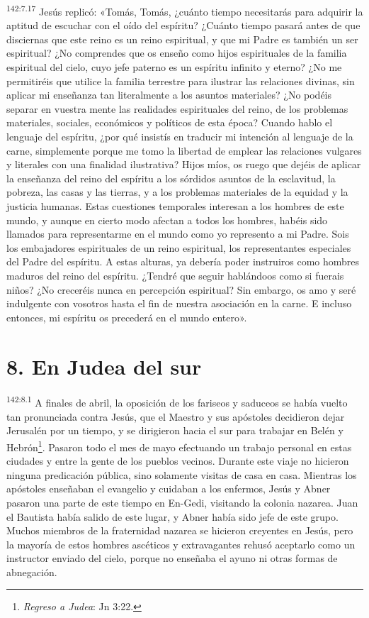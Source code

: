 \par
\textsuperscript{142:7.17} Jesús replicó: «Tomás, Tomás, ¿cuánto tiempo necesitarás para adquirir la aptitud de escuchar con el oído del espíritu? ¿Cuánto tiempo pasará antes de que disciernas que este reino es un reino espiritual, y que mi Padre es también un ser espiritual? ¿No comprendes que os enseño como hijos espirituales de la familia espiritual del cielo, cuyo jefe paterno es un espíritu infinito y eterno? ¿No me permitiréis que utilice la familia terrestre para ilustrar las relaciones divinas, sin aplicar mi enseñanza tan literalmente a los asuntos materiales? ¿No podéis separar en vuestra mente las realidades espirituales del reino, de los problemas materiales, sociales, económicos y políticos de esta época? Cuando hablo el lenguaje del espíritu, ¿por qué insistís en traducir mi intención al lenguaje de la carne, simplemente porque me tomo la libertad de emplear las relaciones vulgares y literales con una finalidad ilustrativa? Hijos míos, os ruego que dejéis de aplicar la enseñanza del reino del espíritu a los sórdidos asuntos de la esclavitud, la pobreza, las casas y las tierras, y a los problemas materiales de la equidad y la justicia humanas. Estas cuestiones temporales interesan a los hombres de este mundo, y aunque en cierto modo afectan a todos los hombres, habéis sido llamados para representarme en el mundo como yo represento a mi Padre. Sois los embajadores espirituales de un reino espiritual, los representantes especiales del Padre del espíritu. A estas alturas, ya debería poder instruiros como hombres maduros del reino del espíritu. ¿Tendré que seguir hablándoos como si fuerais niños? ¿No creceréis nunca en percepción espiritual? Sin embargo, os amo y seré indulgente con vosotros hasta el fin de nuestra asociación en la carne. E incluso entonces, mi espíritu os precederá en el mundo entero».

\section*{8. En Judea del sur}
\par
\textsuperscript{142:8.1} A finales de abril, la oposición de los fariseos y saduceos se había vuelto tan pronunciada contra Jesús, que el Maestro y sus apóstoles decidieron dejar Jerusalén por un tiempo, y se dirigieron hacia el sur para trabajar en Belén y Hebrón\footnote{\textit{Regreso a Judea}: Jn 3:22.}. Pasaron todo el mes de mayo efectuando un trabajo personal en estas ciudades y entre la gente de los pueblos vecinos. Durante este viaje no hicieron ninguna predicación pública, sino solamente visitas de casa en casa. Mientras los apóstoles enseñaban el evangelio y cuidaban a los enfermos, Jesús y Abner pasaron una parte de este tiempo en En-Gedi, visitando la colonia nazarea. Juan el Bautista había salido de este lugar, y Abner había sido jefe de este grupo. Muchos miembros de la fraternidad nazarea se hicieron creyentes en Jesús, pero la mayoría de estos hombres ascéticos y extravagantes rehusó aceptarlo como un instructor enviado del cielo, porque no enseñaba el ayuno ni otras formas de abnegación.

